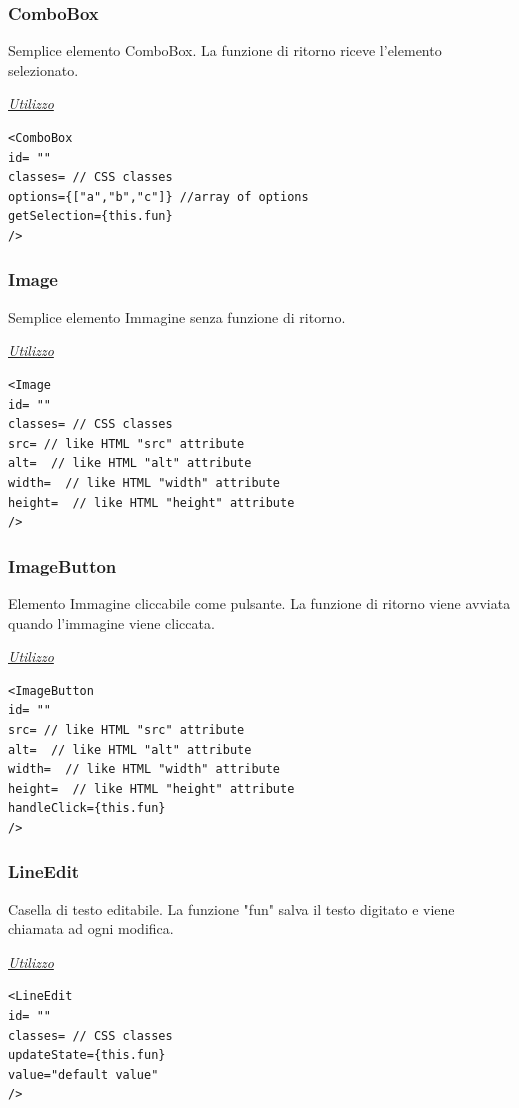 \subsubsection{ComboBox}
Semplice elemento ComboBox. La funzione di ritorno riceve l'elemento selezionato.
\begin{center}
\underline{\textit{Utilizzo}}
\begin{lstlisting}
<ComboBox
id= ""
classes= // CSS classes
options={["a","b","c"]} //array of options
getSelection={this.fun}
/>
\end{lstlisting}
\end{center}

\subsubsection{Image}
Semplice elemento Immagine senza funzione di ritorno.
\begin{center}
\underline{\textit{Utilizzo}}
\begin{lstlisting}
<Image
id= ""
classes= // CSS classes
src= // like HTML "src" attribute
alt=  // like HTML "alt" attribute
width=  // like HTML "width" attribute
height=  // like HTML "height" attribute
/>
\end{lstlisting}
\end{center}

\subsubsection{ImageButton}
Elemento Immagine cliccabile come pulsante. La funzione di ritorno viene avviata quando l'immagine viene cliccata.
\begin{center}
\underline{\textit{Utilizzo}}
\begin{lstlisting}
<ImageButton
id= ""
src= // like HTML "src" attribute
alt=  // like HTML "alt" attribute
width=  // like HTML "width" attribute
height=  // like HTML "height" attribute
handleClick={this.fun}
/>
\end{lstlisting}
\end{center}
\newpage

\subsubsection{LineEdit}
Casella di testo editabile. La funzione "fun" salva il testo digitato e viene chiamata ad ogni modifica.
\begin{center}
\underline{\textit{Utilizzo}}
\begin{lstlisting}
<LineEdit
id= ""
classes= // CSS classes
updateState={this.fun}
value="default value"
/>
\end{lstlisting}
\end{center}

